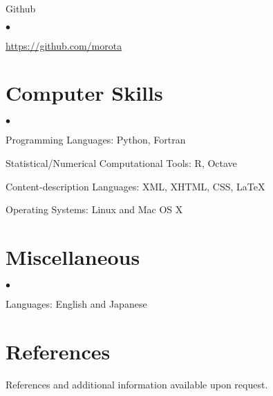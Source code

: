 \documentclass[margin,line,10pt]{res}
\newenvironment{list1}{
  \begin{list}{\ding{113}}{%
      \setlength{\itemsep}{0in}
      \setlength{\parsep}{0in} \setlength{\parskip}{0in}
      \setlength{\topsep}{0in} \setlength{\partopsep}{0in} 
      \setlength{\leftmargin}{0.17in}}}{\end{list}}
\newenvironment{list2}{
  \begin{list}{$\bullet$}{%
      \setlength{\itemsep}{0in}
      \setlength{\parsep}{0in} \setlength{\parskip}{0in}
      \setlength{\topsep}{0in} \setlength{\partopsep}{0in} 
      \setlength{\leftmargin}{0.2in}}}{\end{list}}
\begin{document}
\begin{resume}
\begin{list1}
\vspace{0.3cm}
\item[] Github
\begin{list2}
\item \textcolor{blue}{\href{https://github.com/morota}{https://github.com/morota}} 
\end{list2}
\end{list1}







\vspace{0.5cm}
\section{\sc Computer Skills} 
\begin{list2}
\item Programming Languages: Python, Fortran
\vspace{0.3cm}
\item Statistical/Numerical Computational  Tools: R, Octave
\vspace{0.3cm}
\item Content-description Languages: XML, XHTML, CSS, \LaTeX
\vspace{0.3cm}
\item Operating Systems: Linux and Mac OS X
\end{list2}

\section{\sc Miscellaneous} 
\begin{list2}
\item Languages: English and Japanese \\
\end{list2}



\section{\sc References}
References and additional information available upon request. 

\begin{comment}
\begin{tabular}{ll}
[1] & {\bf \underline{Daniel Gianola}}, Ph.D. Sewall Wright Professor of Animal Breeding and Genetics. \\
    & Department of Animal Sciences, University of Wisconsin-Madison. \\ 
    & Address: 1675 Observatory Dr. Madison, WI 53706-1284.  \\
    & E-mail: gianola -at- ansci.wisc.edu, Phone: 608-265-2054
\end{tabular}
\end{comment}



\end{resume}
\end{document}
